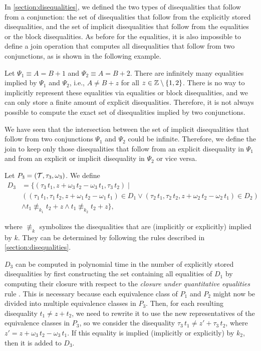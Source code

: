 In \cref{section:disequalities}, we defined the two types of disequalities that follow from a conjunction:
the set of disequalities that follow from the explicitly stored disequalities,
and the set of implicit disequalities that follow from the equalities or the block disequalities.
As before for the equalities, it is also impossible to define a join operation that computes all disequalities that follow from two conjunctions, as is shown in the following example.

\begin{example}
    Let $\Psi_1 \equiv A = B + 1$ and $\Psi_2 \equiv A = B + 2$. There are infinitely many equalities implied by $\Psi_1$ and $\Psi_2$, i.e., $A \neq B + z$ for all $z \in \mathbb{Z} \setminus \{1,2\}$.
    There is no way to implicitly represent these equalities via equalities or block disequalities, and we can only store a finite amount of explicit disequalities.
    Therefore, it is not always possible to compute the exact set of disequalities implied by two conjunctions.
\end{example}

We have seen that the intersection between the set of implicit disequalities that follow from two conjunctions $\Psi_1$ and $\Psi_2$ could be infinite.
Therefore, we define the join to keep only those disequalities that follow from an explicit disequality in $\Psi_1$ and from an explicit or implicit disequality in $\Psi_2$ or vice versa.

Let $P_3 = (\mathcal{T}, \tau_3, \omega_3)$.
We define
\[
\begin{array}{ll}
    D_3 & = \{(\tau_3\,t_1,  z + \omega_3\,t_2 - \omega_3\,t_1, \tau_3\,t_2) \mid                                                                            \\
        & ((\tau_1\,t_1, \tau_1\,t_2, z + \omega_1\,t_2 - \omega_1\,t_1) \in D_1 \lor (\tau_2\,t_1, \tau_2\,t_2, z + \omega_2\,t_2 - \omega_2\,t_1) \in D_2) \\
        & \land t_1 \nequiv_{k_1} t_2 + z \land t_1 \nequiv_{k_2} t_2 + z\},
\end{array}
\]

where $\nequiv_{k}$ symbolizes the disequalities that are (implicitly or explicitly) implied by $k$.
They can be determined by following the rules described in \cref{section:disequalities}.

$D_3$ can be computed in polynomial time in the number of explicitly stored disequalities by first constructing the set containing all equalities of $D_1$ by computing their closure with respect to the \emph{closure under quantitative equalities} rule .
This is necessary because each equivalence class of $P_1$ and $P_2$ might now be divided into multiple equivalence classes in $P_3$.
Then, for each resulting disequality $t_1 \neq z + t_2$,
we need to rewrite it to use the new representatives of the equivalence classes in $P_3$,
so we consider the disequality $\tau_3\,t_1 \neq z' + \tau_3\,t_2$,
where $z' = z + \omega_3\,t_2 - \omega_3\,t_1$.
If this equality is implied (implicitly or explicitly) by $k_2$, then it is added to $D_3$.

